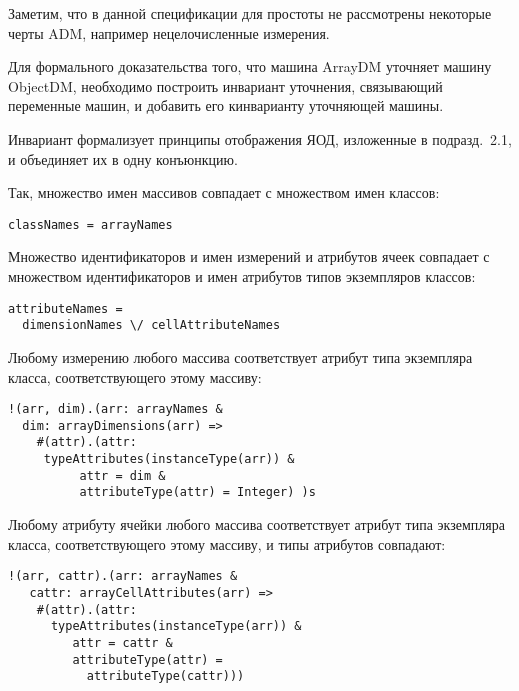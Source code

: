 \begin{multicols}{2}
        Заметим, что в данной спецификации для прос\-то\-ты не рассмотрены 
некоторые черты ADM, например нецелочисленные измерения.
        
        \smallskip
        
        Для формального доказательства того, что машина {\sf ArrayDM} уточняет 
машину {\sf ObjectDM}, необходимо построить {инвариант уточнения}, 
связы\-вающий переменные машин, и добавить его к\linebreak инварианту уточняющей 
машины. 
        
        Инвариант формализует принципы отображения ЯОД, изложенные в 
подразд.~2.1, и объединяет их в одну конъюнкцию.
        
        Так, множество имен массивов совпадает с множеством имен классов:
        \begin{verbatim}
classNames = arrayNames
\end{verbatim}

        
        Множество идентификаторов и имен измерений и атрибутов ячеек 
совпадает с множеством идентификаторов и имен атрибутов типов экземпляров 
классов:
        \begin{verbatim}
attributeNames = 
  dimensionNames \/ cellAttributeNames
\end{verbatim}


        Любому измерению любого массива соответствует атрибут типа 
экземпляра класса, соответствующего этому массиву:
        \begin{verbatim}
!(arr, dim).(arr: arrayNames & 
  dim: arrayDimensions(arr) =>
    #(attr).(attr: 
     typeAttributes(instanceType(arr)) &
          attr = dim & 
          attributeType(attr) = Integer) )s
        \end{verbatim}
        
                        \vspace*{-6pt}
        
        Любому атрибуту ячейки любого массива соответствует атрибут типа 
экземпляра класса, соответствующего этому массиву, и типы атрибутов 
совпадают:
        \begin{verbatim}
!(arr, cattr).(arr: arrayNames & 
   cattr: arrayCellAttributes(arr) =>
    #(attr).(attr: 
      typeAttributes(instanceType(arr)) & 
         attr = cattr & 
         attributeType(attr) = 
           attributeType(cattr)))
        \end{verbatim}
        

\end{multicols}
